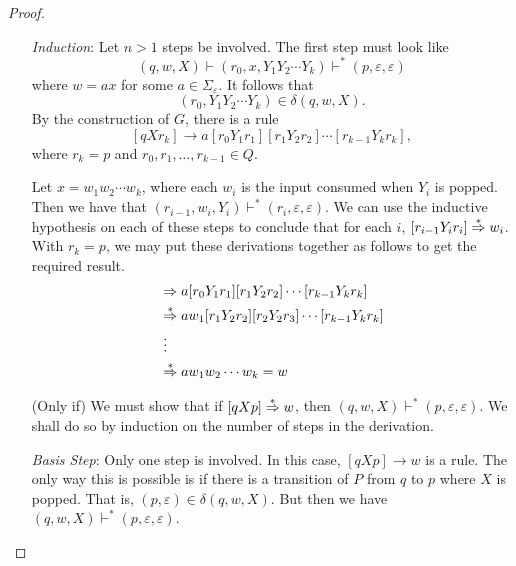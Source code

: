 \begin{proof}
\begin{itemize}
        \vspace{1mm}
        \textit{Induction}: Let $n>1$ steps be involved.
        The first step must look like
        $$(q,w,X)\vdash (r_0,x,Y_1Y_2\cdots Y_k) \vdash^* (p,\varepsilon,\varepsilon)$$
        where $w=ax$ for some $a\in\Sigma_\varepsilon$. It follows that
        $$(r_0,Y_1Y_2\cdots Y_k)\in\delta(q,w,X).$$
        By the construction of $G$, there is a rule $$[qXr_k]\to a[r_0Y_1r_1][r_1Y_2r_2]\cdots[r_{k-1}Y_kr_k],$$ where $r_k=p$ and $r_0,r_1,\ldots,r_{k-1}\in Q$.
        
        Let $x=w_1w_2\cdots w_k$, where each $w_i$ is the input consumed when $Y_i$ is popped. Then we have that $(r_{i-1},w_i,Y_i)\vdash^*(r_i,\varepsilon,\varepsilon)$. We can use the inductive hypothesis on each of these steps to conclude that for each $i$, $[r_{i-1}Y_ir_i]\overset{*}{\Rightarrow} w_i$. With $r_k=p$, we may put these derivations together as follows to get the required result.
        \begin{align*}
            [qXr_k] &\yields a[r_0Y_1r_1][r_1Y_2r_2]\cdots[r_{k-1}Y_kr_k] \\
                    &\derives aw_1[r_1Y_2r_2][r_2Y_2r_3]\cdots[r_{k-1}Y_kr_k] \\
                    &\;\vdots \\
                    &\derives aw_1w_2\cdots w_k = w
        \end{align*}
        
        \item[(Only if)]
        We must show that if $[qXp]\overset{*}{\Rightarrow} w$, then $(q,w,X)\vdash^*(p,\varepsilon,\varepsilon)$.  We shall do so by induction on the number of steps in the derivation.
        
        \vspace{2mm}
        \textit{Basis Step}: Only one step is involved. In this case, $[qXp]\to w$ is a rule. The only way this is possible is if there is a transition of $P$ from $q$ to $p$ where $X$ is popped. That is, $(p,\varepsilon)\in\delta(q,w,X)$. But then we have $(q,w,X)\vdash^* (p,\varepsilon,\varepsilon)$.
        

\end{itemize}
\end{proof}
